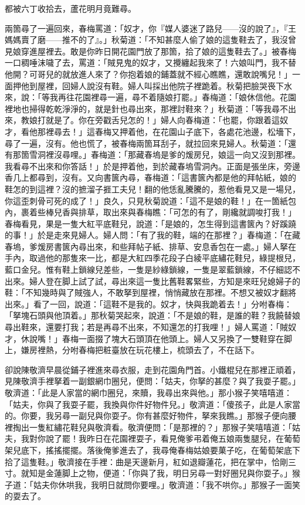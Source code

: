 \begin{myquote}
都被六丁收拾去，蘆花明月竟難尋。
\end{myquote}

兩箇尋了一遍回來，春梅罵道：「奴才，你『媒人婆迷了路兒——沒的說了』，『王媽媽賣了磨——推不的了』。」秋菊道：「不知甚麼人偷了娘的這隻鞋去了，我沒曾見娘穿進屋裡去。敢是你昨日開花園門放了那箇，拾了娘的這隻鞋去了。」被春梅一口稠唾沫噦了去，罵道：「賊見鬼的奴才，又攪纏起我來了！六娘叫門，我不替他開？可哥兒的就放進人來了？你抱着娘的鋪蓋就不經心瞧瞧，還敢說嘴兒！」一面押他到屋裡，回婦人說沒有鞋。婦人叫採出他院子裡跪着。秋菊把臉哭䘮下水來，說：「等我再往花園裡尋一遍，尋不着隨娘打罷。」春梅道：「娘休信他。花園裡地也掃得乾乾淨淨的，就是針也尋出來，那裡討鞋來？」秋菊道：「等我尋不出來，教娘打就是了。你在旁戳舌兒怎的！」婦人向春梅道：「也罷，你跟着這奴才，看他那裡尋去！」這春梅又押着他，在花園山子底下，各處花池邊，松墻下，尋了一遍，沒有。他也慌了，被春梅兩箇耳刮子，就拉回來見婦人。秋菊道：「還有那箇雪洞裡沒尋哩。」春梅道：「那藏春塢是爹的煖房兒，娘這一向又沒到那裡。我看尋不出來和你答話！」於是押着他，到於藏春塢雪洞內。正面是張坐床，旁邊香几上都尋到，沒有。又向書篋內尋，春梅道：「這書篋內都是他的拜帖紙，娘的鞋怎的到這裡？沒的摭溜子捱工夫兒！{}翻的他恁亂騰騰的，惹他看見又是一場兒，你這歪刺骨可死的成了！」良久，只見秋菊說道：「這不是娘的鞋！」{}在一箇紙包內，裹着些棒兒香與排草，取出來與春梅瞧：「可怎的有了，剛纔就調唆打我！」春梅看見，果是一隻大紅平底鞋兒，說道：「是娘的，怎生得到這書篋內？好蹊蹺的事！」於是走來見婦人。婦人問：「有了我的鞋，端的在那裡？」春梅道：「在藏春塢，爹煖房書篋內尋出來，和些拜帖子紙、排草、安息香包在一處。」婦人拏在手內，取過他的那隻來一比，都是大紅四季花段子白綾平底繡花鞋兒，綠提根兒，藍口金兒。惟有鞋上鎖線兒差些，一隻是紗綠鎖線，一隻是翠藍鎖線，不仔細認不出來。婦人登在脚上試了試，尋出來這一隻比舊鞋畧緊些，方知是來旺兒媳婦子的鞋：「不知幾時與了賊強人，不敢拏到屋裡，悄悄藏放在那裡。不想又被奴才翻將出來。」看了一回，說道：「這鞋不是我的。奴才，快與我跪着去！」分咐春梅：「拏塊石頭與他頂着。」那秋菊哭起來，說道：「不是娘的鞋，是誰的鞋？我饒替娘尋出鞋來，還要打我；若是再尋不出來，不知還怎的打我哩！」婦人罵道：「賊奴才，休說嘴！」春梅一面掇了塊大石頭頂在他頭上。婦人又另換了一雙鞋穿在脚上，嫌房裡熱，分咐春梅把粧臺放在玩花樓上，梳頭去了，不在話下。

卻說陳敬濟早晨從鋪子裡進來尋衣服，走到花園角門首。小鐵棍兒在那裡正頑着，見陳敬濟手裡拏着一副銀網巾圈兒，便問：「姑夫，你拏的甚麼？與了我耍子罷。」敬濟道：「此是人家當的網巾圈兒，來贖，我尋出來與他。」那小猴子笑嘻嘻道：「姑夫，你與了我耍子罷，我換與你件好物件兒。」敬濟道：「傻孩子，此是人家當的。你要，我另尋一副兒與你耍子。你有甚麼好物件，拏來我瞧。」那猴子便向腰裡掏出一隻紅繡花鞋兒與敬濟看。敬濟便問：「是那裡的？」那猴子笑嘻嘻道：「姑夫，我對你說了罷！我昨日在花園裡耍子，看見俺爹弔着俺五娘兩隻腿兒，在葡萄架兒底下，搖搖擺擺。{}落後俺爹進去了，我尋俺春梅姑娘要菓子吃，在葡萄架底下拾了這隻鞋。」敬濟接在手裡：曲是天邊新月，紅如退瓣蓮花，把在掌中，恰剛三寸。就知是金蓮脚上之物，便道：「你與了我，明日另尋一對好圈兒與你耍子。」猴子道：「姑夫你休哄我，我明日就問你要哩。」敬濟道：「我不哄你。」那猴子一面笑的耍去了。

